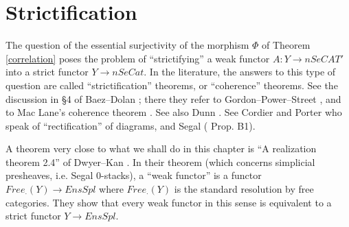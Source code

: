 %

\clearpage
\section{Strictification}
\label{strictpage}

The question of the essential surjectivity of the morphism $\Phi$ of
Theorem \ref{correlation} poses the problem of ``strictifying'' a weak
functor $A: Y \rightarrow nSeCAT'$ into a strict functor $Y \rightarrow
nSeCat$. In the literature, the answers to this type of question are called
``strictification'' theorems, or ``coherence'' theorems.
See the discussion in \S 4 of Baez--Dolan \cite{BaezDolan};
there they refer to Gordon--Power--Street \cite{Gordon-Power-Street},
and to Mac Lane's coherence theorem \cite{MacLane2}.
See also Dunn \cite{Dunn97}.
See Cordier and Porter \cite{CordierPorter2} \cite{CordierPorter3}
who speak of ``rectification'' of diagrams, and Segal
(\cite{SegalTopology} Prop. B1).

A theorem very close to what we shall do in this chapter is
``A realization theorem 2.4'' of Dwyer--Kan \cite{DwyerKanDiags}.
In their theorem (which concerns simplicial presheaves, i.e.
Segal $0$-stacks), a ``weak functor'' is a functor
$Free _{\cdot}(Y)\rightarrow EnsSpl$ where $Free_{\cdot}(Y)$ is the standard
resolution by free categories. They show that every weak functor in this
sense is equivalent to a strict functor $Y\rightarrow EnsSpl$.

